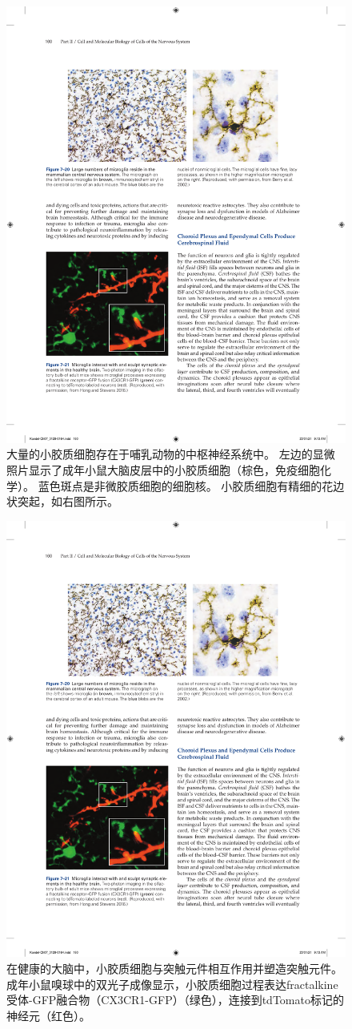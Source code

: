 \begin{figure}[htbp]
	\centering
	\includegraphics[width=0.8\linewidth]{chap07/fig_7_20}
	\caption{大量的小胶质细胞存在于哺乳动物的中枢神经系统中。
		左边的显微照片显示了成年小鼠大脑皮层中的小胶质细胞（棕色，免疫细胞化学）。
		蓝色斑点是非微胶质细胞的细胞核。
		小胶质细胞有精细的花边状突起，如右图所示。}
	\label{fig:7_20}
\end{figure}


\begin{figure}[htbp]
	\centering
	\includegraphics[width=0.5\linewidth]{chap07/fig_7_21}
	\caption{在健康的大脑中，小胶质细胞与突触元件相互作用并塑造突触元件。
		成年小鼠嗅球中的双光子成像显示，小胶质细胞过程表达fractalkine受体-GFP融合物（CX3CR1-GFP）（绿色），连接到tdTomato标记的神经元（红色）。}
	\label{fig:7_21}
\end{figure}


